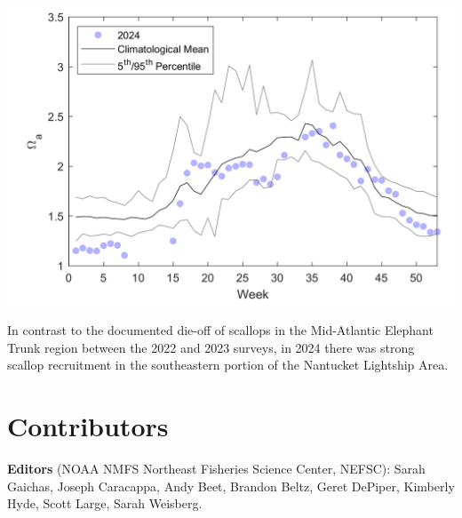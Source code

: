 \documentclass[
  10pt,
]{article}
\let\origfigure\figure
\let\endorigfigure\endfigure
\renewenvironment{figure}[1][2] {
    \expandafter\origfigure\expandafter[H]
} {
    \endorigfigure
}
\begin{document}
\begin{figure}

{\centering \includegraphics[width=0.6\linewidth]{images/BothReports/GOMoa_image} 

}

\caption{Weekly average surface aragonite saturation state measured at the long-term buoy location in the Gulf of Maine at 43.02 N and 70.54 W}\label{fig:GOMoa}
\end{figure}

In contrast to the documented die-off of scallops in the Mid-Atlantic Elephant Trunk region between the 2022 and 2023 surveys, in 2024 there was strong scallop recruitment in the southeastern portion of the Nantucket Lightship Area.

\section{Contributors}\label{contributors}

\textbf{Editors} (NOAA NMFS Northeast Fisheries Science Center, NEFSC): Sarah Gaichas, Joseph Caracappa, Andy Beet, Brandon Beltz, Geret DePiper, Kimberly Hyde, Scott Large, Sarah Weisberg.
\end{document}
